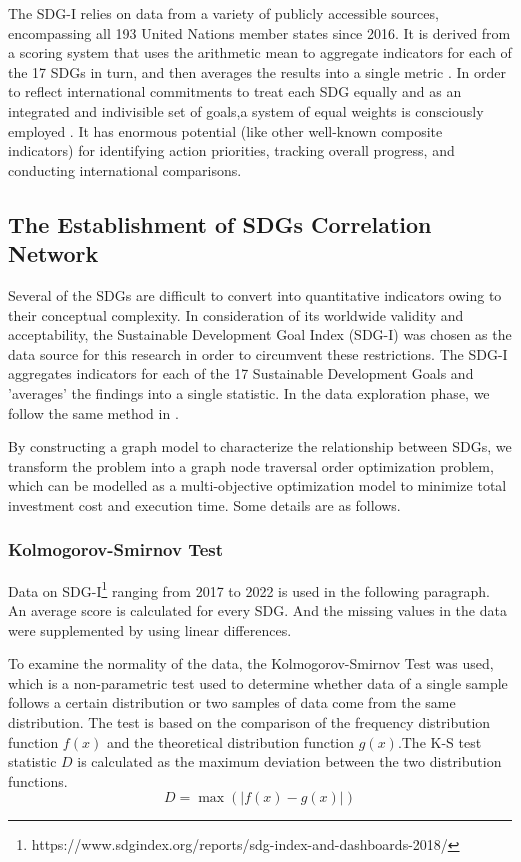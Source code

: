 \documentclass[10pt]{mcmthesis}
\begin{document}
The SDG-I relies on data from a variety of publicly accessible sources, encompassing all 193 United Nations member states since 2016. It is derived from a scoring system that uses the arithmetic mean to aggregate indicators for each of the 17 SDGs in turn, and then averages the results into a single metric \cite{biggeri2019tracking}. In order to reflect international commitments to treat each SDG equally and as an integrated and indivisible set of goals,a system of equal weights is consciously employed \cite{stiftung2018sustainable}. It has enormous potential (like other well-known composite indicators) for identifying action priorities, tracking overall progress, and conducting international comparisons.

\subsection{The Establishment of SDGs Correlation Network}
Several of the SDGs are difficult to convert into quantitative indicators owing to their conceptual complexity. 
In consideration of its worldwide validity and acceptability, the Sustainable Development Goal Index (SDG-I) \cite{pradhan2017systematic} was chosen as the data source for this research in order to circumvent these restrictions. 
The SDG-I aggregates indicators for each of the 17 Sustainable Development Goals and 'averages' the findings into a single statistic. 
In the data exploration phase, we follow the same method in \cite{fonseca2020mapping}.

By constructing a graph model to characterize the relationship between SDGs, we transform the problem into a graph node traversal order optimization problem, which can be modelled as a multi-objective optimization model to minimize total investment cost and execution time. Some details are as follows.


\subsubsection{ Kolmogorov-Smirnov Test}
Data on SDG-I\footnote{https://www.sdgindex.org/reports/sdg-index-and-dashboards-2018/} ranging from 2017 to 2022 is used in the following paragraph. An average score is calculated for every SDG. And the missing values in the data were supplemented by using linear differences.

To examine the normality of the data, the Kolmogorov-Smirnov Test was used, which is a non-parametric test used to determine whether data of a single sample follows a certain distribution or two samples of data come from the same distribution. The test is based on the comparison of the frequency distribution function $f(x)$ and the theoretical distribution function $g(x)$.The K-S test statistic $D$ is calculated as the maximum deviation between the two distribution functions. 
\begin{equation}
D=\max \left(\left|f(x)-g(x)\right|\right)
\end{equation}
\end{document}
